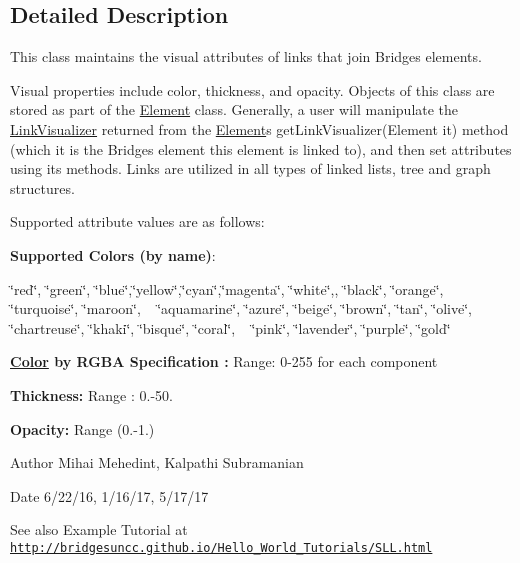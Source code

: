 \subsection{Detailed Description}
This class maintains the visual attributes of links that join Bridges elements. 

Visual properties include color, thickness, and opacity. Objects of this class are stored as part of the \mbox{\hyperlink{classbridges_1_1base_1_1_element}{Element}} class. Generally, a user will manipulate the \mbox{\hyperlink{classbridges_1_1base_1_1_link_visualizer}{Link\+Visualizer}} returned from the \mbox{\hyperlink{classbridges_1_1base_1_1_element}{Element}}\textquotesingle{}s get\+Link\+Visualizer(\+Element it) method (which it is the Bridges element this element is linked to), and then set attributes using its methods. Links are utilized in all types of linked lists, tree and graph structures.

Supported attribute values are as follows\+:

{\bfseries Supported Colors (by name)}\+: 

\char`\"{}red\char`\"{}, \char`\"{}green\char`\"{}, \char`\"{}blue\char`\"{},\char`\"{}yellow\char`\"{},\char`\"{}cyan\char`\"{},\char`\"{}magenta\char`\"{}, \char`\"{}white\char`\"{},, \char`\"{}black\char`\"{}, \char`\"{}orange\char`\"{}, \char`\"{}turquoise\char`\"{}, \char`\"{}maroon\char`\"{}, ~\newline
 \char`\"{}aquamarine\char`\"{}, \char`\"{}azure\char`\"{}, \char`\"{}beige\char`\"{}, \char`\"{}brown\char`\"{}, \char`\"{}tan\char`\"{}, \char`\"{}olive\char`\"{}, \char`\"{}chartreuse\char`\"{}, \char`\"{}khaki\char`\"{}, \char`\"{}bisque\char`\"{}, \char`\"{}coral\char`\"{}, ~\newline
 \char`\"{}pink\char`\"{}, \char`\"{}lavender\char`\"{}, \char`\"{}purple\char`\"{}, \char`\"{}gold\char`\"{} 

{\bfseries  \mbox{\hyperlink{classbridges_1_1base_1_1_color}{Color}} by R\+G\+BA Specification \+:} Range\+: 0-\/255 for each component 

{\bfseries  Thickness\+: } Range \+: 0.-\/50.

{\bfseries  Opacity\+: } Range (0.-\/1.) 

\begin{DoxyAuthor}{Author}
Mihai Mehedint, Kalpathi Subramanian
\end{DoxyAuthor}
\begin{DoxyDate}{Date}
6/22/16, 1/16/17, 5/17/17
\end{DoxyDate}
\begin{DoxySeeAlso}{See also}
Example Tutorial at ~\newline
 \href{http://bridgesuncc.github.io/Hello_World_Tutorials/SLL.html}{\tt http\+://bridgesuncc.\+github.\+io/\+Hello\+\_\+\+World\+\_\+\+Tutorials/\+S\+L\+L.\+html} 
\end{DoxySeeAlso}


